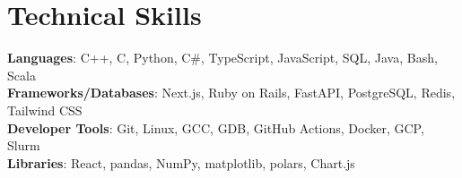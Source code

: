 \documentclass[letterpaper,11pt]{article}
\begin{document}
\section{Technical Skills}
 \begin{itemize}[leftmargin=0.15in, label={}]
    \small{\item{
     \textbf{Languages}{: C++, C, Python, C\#, TypeScript, JavaScript, SQL, Java, Bash, Scala} \\
     \textbf{Frameworks/Databases}{: Next.js, Ruby on Rails, FastAPI, PostgreSQL, Redis, Tailwind CSS} \\
     \textbf{Developer Tools}{: Git, Linux, GCC, GDB, GitHub Actions, Docker, GCP, Slurm} \\
     \textbf{Libraries}{: React, pandas, NumPy, matplotlib, polars, Chart.js}
    }}
 \end{itemize}

\end{document}
